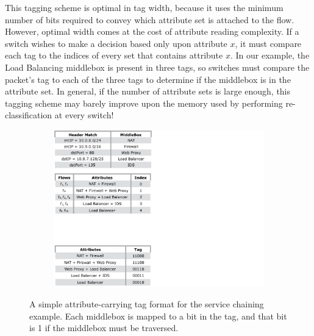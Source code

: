 This tagging scheme is optimal in tag width, because it uses the minimum number of bits required to convey which attribute set is attached to the flow. However, optimal width comes at the cost of attribute reading complexity. If a switch wishes to make a decision based only upon attribute $x$, it must compare each tag to the indices of every set that contains attribute $x$. In our example, the Load Balancing middlebox is present in three tags, so switches must compare the packet's tag to each of the three tags to determine if the middlebox is in the attribute set. In general, if the number of attribute sets is large enough, this tagging scheme may barely improve upon the memory used by performing re-classification at every switch!







\begin{figure}[t!] 
\begin{minipage}{1\linewidth}
\begin{subfigure}[c]{0.96\linewidth}
\includegraphics[trim={0 0 19cm 19.5cm}, clip, width=\linewidth]{figures/mbox_path_example3}
\end{subfigure} 
\end{minipage} 
\caption{A simple attribute-carrying tag format for the service chaining example. Each middlebox is mapped to a bit in the tag, and that bit is 1 if the middlebox must be traversed.}
\label{fig:att_tags}
\end{figure}

